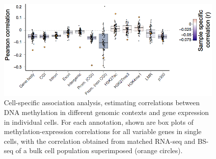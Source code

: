 \begin{figure}[htbp!]
\centering
\includegraphics[width=1.0\textwidth]{cell}
\caption[Cell-specific correlation analysis]{Cell-specific association analysis, estimating correlations between DNA methylation in different genomic contexts and gene expression in individual cells. For each annotation, shown are box plots of methylation-expression correlations for all variable genes in single cells, with the correlation obtained from matched RNA-seq and BS-seq of a bulk cell population superimposed (orange circles).}
\label{fig:mt_cell}
\end{figure}

